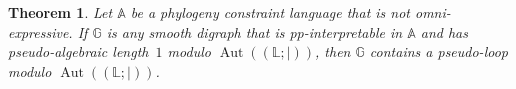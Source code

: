 \documentclass[a4paper,reqno, cleveref]{amsart}
\newtheorem{theorem}{Theorem}[section]
\newcommand{\struct}[1]{\mathbb{#1}}
\newcommand{\s}{\ensuremath{\mathrm{s}}\xspace}
\DeclareMathOperator{\pr}{pr}
\DeclareMathOperator{\Aut}{Aut}
\newcommand{\sA}{\mathbb A}
\newcommand{\sG}{\mathbb G}
\newcommand{\sL}{\mathbb L}
\newcommand{\bin}{E}
\newcommand{\Phylo}[1]{\ensuremath{(\struct{L};|)}#1}
\newcommand{\tx}{\ensuremath{\mathrm{tx}}\xspace}
\newcommand\mo[1]{\textcolor{black}{#1}} %
\begin{document}



\begin{theorem}\label{phylo:theorem:graph:pseudoloop} Let $\sA$ be a phylogeny constraint language  that is not omni-expressive. If $\sG$ is any smooth digraph that is pp-interpretable in $\sA$ and has pseudo-algebraic length~$1$ modulo $\Aut(\Phylo)$, then $\sG$ contains a pseudo-loop modulo $\Aut(\Phylo)$.
\end{theorem}
\end{document}
